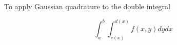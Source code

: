 %
%
%
%
%
%
%
%
%
%
%
To apply Gaussian quadrature to the double integral

$$
\int_{a}^{b} \int_{c(x)}^{d(x)} f(x, y) d y d x
$$

